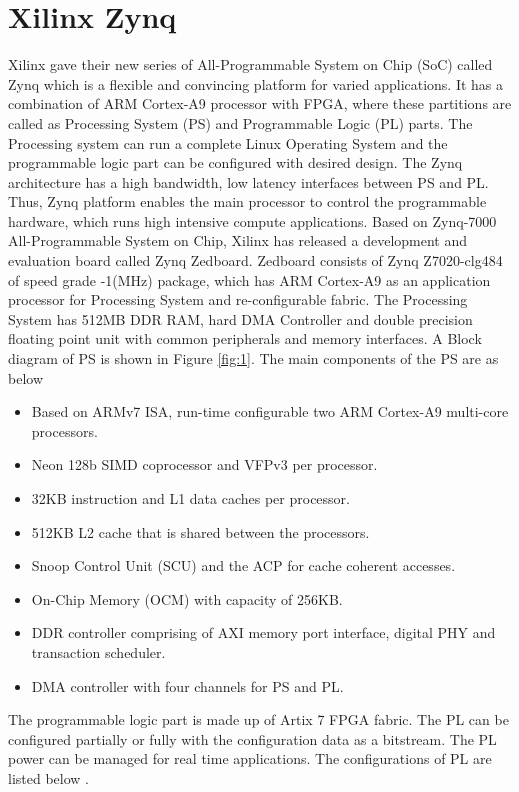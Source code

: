 \section{Xilinx Zynq}
Xilinx gave their new series of All-Programmable System on Chip (SoC) called Zynq which is a flexible and convincing platform for varied applications. It has a combination of ARM Cortex-A9 processor with FPGA, where these partitions are called as Processing System (PS) and Programmable Logic (PL) parts. The Processing system can run a complete Linux Operating System and the programmable logic part can be configured with desired design. The Zynq architecture has a high bandwidth, low latency interfaces between PS and PL. Thus, Zynq platform enables the main processor to control the programmable hardware, which runs high intensive compute applications. Based on Zynq-7000 All-Programmable System on Chip, Xilinx has released a development and evaluation board called Zynq Zedboard. Zedboard consists of Zynq Z7020-clg484 of speed grade -1(MHz) package, which has ARM Cortex-A9 as an application processor for Processing System and re-configurable fabric. The Processing System has 512MB DDR RAM, hard DMA Controller and double precision floating point unit with common peripherals and memory interfaces. A Block diagram of PS is shown in Figure \ref{fig:1}\cite{11}. The main components of the PS are as below

\begin{itemize}\itemsep0em 
	\item Based on ARMv7 ISA, run-time configurable two ARM Cortex-A9 multi-core processors.
	\item Neon 128b SIMD coprocessor and VFPv3 per processor.
	\item 32KB instruction and L1 data caches per processor.
	\item 512KB L2 cache that is shared between the processors.
	\item Snoop Control Unit (SCU) and the ACP for cache coherent accesses.
	\item On-Chip Memory (OCM) with capacity of 256KB.
	\item DDR controller comprising of AXI memory port interface, digital PHY and transaction scheduler.
	\item DMA controller with four channels for PS and PL.
\end{itemize}


The programmable logic part is made up of Artix 7 FPGA fabric. The PL can be configured partially or fully with the configuration data as a bitstream. The PL power can be managed for real time applications. The configurations of PL are listed below \cite{23}.

